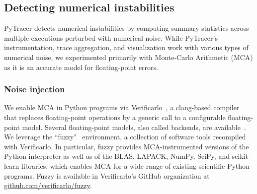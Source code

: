 \documentclass[11pt]{article}
\newcommand{\tristan}[1]{\color{orange}\textbf{From Tristan:} #1\color{black}\xspace}
\newcommand{\Yohan}[1]{\color{green!75!black}\textbf{Yohan:} #1\color{black}\xspace}
\newcommand{\pytracer}[0]{PyTracer\xspace}
\begin{document}

\subsection{Detecting numerical instabilities}

\pytracer detects numerical instabilities by computing summary statistics across multiple executions perturbed with numerical noise. While \pytracer's instrumentation, trace aggregation, and visualization work with various types of numerical noise, we experimented primarily with Monte-Carlo Arithmetic (MCA) as it is an accurate model for floating-point errors.

\subsubsection{Noise injection}
\label{sec:fuzzy}


We enable MCA in Python programs via Verificarlo~\cite{verificarlo}, a clang-based compiler~\cite{lattner2008llvm} that replaces floating-point operations by a generic call to a configurable floating-point model. Several floating-point models, also called backends, are available~\cite{chatelain2019automatic,chatelain2019outils}.
We leverage the ``fuzzy"~\cite{kiar2020comparing} environment, a collection of software tools recompiled with Verificarlo. In particular, fuzzy provides MCA-instrumented versions of the Python interpreter as well as of the BLAS, LAPACK, NumPy, SciPy, and scikit-learn libraries, which enables MCA for a wide range of existing scientific Python programs. Fuzzy is available in Verificarlo's GitHub organization at \href{https://github.com/verificarlo/fuzzy}{\url{github.com/verificarlo/fuzzy}}.
\end{document}
